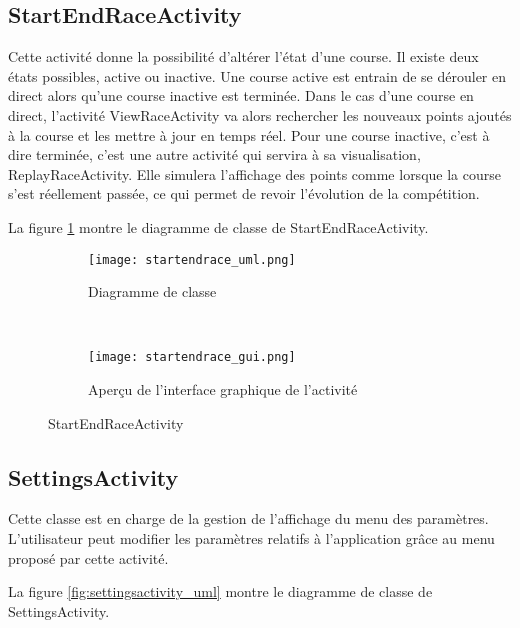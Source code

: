 \subsection{StartEndRaceActivity}

Cette activité donne la possibilité d'altérer l'état d'une course. Il existe deux états possibles, active ou inactive. Une course active est entrain de se dérouler en direct alors qu'une course inactive est terminée. Dans le cas d'une course en direct, l'activité ViewRaceActivity va alors rechercher les nouveaux points ajoutés à la course et les mettre à jour en temps réel. Pour une course inactive, c'est à dire terminée, c'est une autre activité qui servira à sa visualisation, ReplayRaceActivity. Elle simulera l'affichage des points comme lorsque la course s'est réellement passée, ce qui permet de revoir l'évolution de la compétition.

La figure \ref{fig:startendrace_uml} montre le diagramme de classe de StartEndRaceActivity.

\begin{figure}[htb!]
    \centering
    \begin{subfigure}[htb]{0.49\textwidth}
		\texttt{[image: startendrace\_uml.png]} 
		\caption{Diagramme de classe}
		\label{fig:startendrace_uml}
    \end{subfigure}
    ~ %
    \begin{subfigure}[htb]{0.49\textwidth}
		\texttt{[image: startendrace\_gui.png]} 
		\caption{Aperçu de l'interface graphique de l'activité}
		\label{fig:startendrace_gui}
    \end{subfigure}
    \caption{StartEndRaceActivity}\label{fig:startendrace_fig}
\end{figure}

\subsection{SettingsActivity}

Cette classe est en charge de la gestion de l'affichage du menu des paramètres. L'utilisateur peut modifier les paramètres relatifs à l'application grâce au menu proposé par cette activité.

La figure \ref{fig:settingsactivity_uml} montre le diagramme de classe de SettingsActivity.

